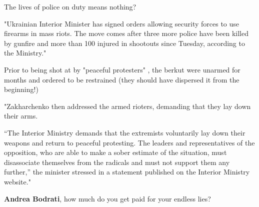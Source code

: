 \begin{itemize}
\begin{itemize}

The lives of police on duty means nothing?

"Ukrainian Interior Minister has signed orders allowing security forces to use
firearms in mass riots. The move comes after three more police have been killed
by gunfire and more than 100 injured in shootouts since Tuesday, according to
the Ministry."


Prior to being shot at by "peaceful protesters" , the berkut were unarmed for
months and ordered to be restrained (they should have dispersed it from the
beginning!)


"Zakharchenko then addressed the armed rioters, demanding that they lay down
their arms.

\enquote{The Interior Ministry demands that the extremists voluntarily lay down their
weapons and return to peaceful protesting. The leaders and representatives of
the opposition, who are able to make a sober estimate of the situation, must
disassociate themselves from the radicals and must not support them any
further,} the minister stressed in a statement published on the Interior
Ministry website."

\textbf{Andrea Bodrati}, how much do you get paid for your endless lies?


\end{itemize} %

\end{itemize} %
